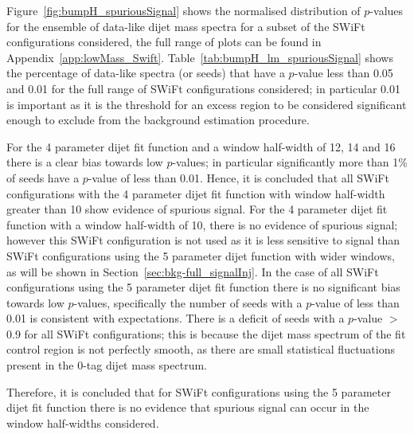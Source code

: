 \newpage
Figure~\ref{fig:bumpH_spuriousSignal} shows the normalised distribution of \mbox{$p$-value}s for the ensemble of data-like dijet mass spectra
for a subset of the SWiFt configurations considered, the full range of plots can be found in Appendix~\ref{app:lowMass_Swift}.
Table~\ref{tab:bumpH_lm_spuriousSignal} shows the percentage of data-like spectra (or seeds)
that have a \bh{} \mbox{$p$-value} less than %
0.05 and 0.01 for the full range of SWiFt configurations considered;
in particular 0.01 is important as it is the threshold for an excess region to be considered significant enough
to exclude from the background estimation procedure.

For the 4 parameter dijet fit function and a window half-width of 12, 14 and 16
there is a clear bias towards low \bh{} \mbox{$p$-value}s;
in particular significantly more than 1\% of seeds have a \bh{} \mbox{$p$-value} of less than 0.01.
Hence, it is concluded that all SWiFt configurations with the 4 parameter dijet fit function with window half-width greater than 10
show evidence of spurious signal.
For the 4 parameter dijet fit function with a window half-width of 10, there is no evidence of spurious signal;
however this SWiFt configuration is not used as it is less sensitive to signal than SWiFt configurations
using the 5 parameter dijet function with wider windows, as will be shown in Section~\ref{sec:bkg-full_signalInj}.
In the case of all SWiFt configurations using the 5 parameter dijet fit function
there is no significant bias towards low \bh{} \mbox{$p$-value}s,
specifically the number of seeds with a \bh{} \mbox{$p$-value} of less than 0.01 is consistent with expectations.
There is a deficit of seeds with a \bh{} $p$-value $>$ 0.9 for all SWiFt configurations;
this is because the dijet mass spectrum of the fit control region is not perfectly smooth,
as there are small statistical fluctuations present in the 0-tag dijet mass spectrum.

Therefore, it is concluded that for SWiFt configurations using the 5 parameter dijet fit function
there is no evidence that spurious signal can occur in the window half-widths considered.

